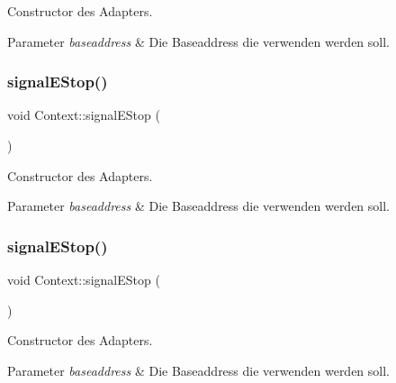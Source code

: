 Constructor des Adapters.


\begin{DoxyParams}{Parameter}
{\em baseaddress} & Die Baseaddress die verwenden werden soll. \\
\hline
\end{DoxyParams}
\hypertarget{class_context_a18bc1a709e3db9477e133f545f7cf66a}{}\label{class_context_a18bc1a709e3db9477e133f545f7cf66a} 
\subsubsection{\texorpdfstring{signal\+E\+Stop()}{signalEStop()}\hspace{0.1cm}{\footnotesize\ttfamily [1/2]}}
{\footnotesize\ttfamily void Context\+::signal\+E\+Stop (\begin{DoxyParamCaption}{ }\end{DoxyParamCaption})}

Constructor des Adapters.


\begin{DoxyParams}{Parameter}
{\em baseaddress} & Die Baseaddress die verwenden werden soll. \\
\hline
\end{DoxyParams}
\hypertarget{class_context_a18bc1a709e3db9477e133f545f7cf66a}{}\label{class_context_a18bc1a709e3db9477e133f545f7cf66a} 
\subsubsection{\texorpdfstring{signal\+E\+Stop()}{signalEStop()}\hspace{0.1cm}{\footnotesize\ttfamily [2/2]}}
{\footnotesize\ttfamily void Context\+::signal\+E\+Stop (\begin{DoxyParamCaption}{ }\end{DoxyParamCaption})}

Constructor des Adapters.


\begin{DoxyParams}{Parameter}
{\em baseaddress} & Die Baseaddress die verwenden werden soll. \\
\hline
\end{DoxyParams}
\hypertarget{class_context_af78ea1902addcf137e8e7d99431592c6}{}\label{class_context_af78ea1902addcf137e8e7d99431592c6} 
